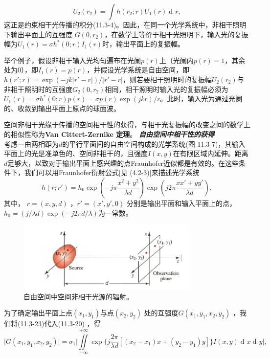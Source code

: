 \documentclass[UTF8]{ctexart}
\numberwithin{figure}{subsection}
\numberwithin{table}{subsection}
\DeclareMathOperator\dif{d\!}
\begin{document}
\begin{equation}
U_2(r_2) = \int h(r_2; r) U_1 (r) \dif r ,
\end{equation}
这正是约束相干光传播的积分(11.3-4)。因此，在同一个光学系统中，非相干照明下输出平面上的互强度 $G(0, r_2)$，在数学上等价于相干光照明下，输入光的复振幅为$U_1 (r) = \sigma h^\ast (0; r) I_1 (r)$时，输出平面上的复振幅。 
\par 举个例子，假设非相干输入光均匀遍布在光阑$p(r)$上（光阑内$p(r) = 1$，其余处为0），即$I_1 (r) = p(r)$，并假设光学系统是自由空间，即$h(r'; r) = \exp (-jk\lvert r' - r \rvert) / \lvert r' - r \rvert$，则若要相干照明时的复振幅$U_2 (r_2)$与非相干照明时的互强度$G_2 (0, r_2)$相同，相干照明时输入光的复振幅必须为$U_1 (r) = \sigma h^\ast (0; r) p(r) = \sigma p(r) \exp (jkr) / r$。此时，输入光为通过光阑的、收敛到输出平面上原点的球面波。
\par 空间非相干光缘于传播的空间相干性的获得，与相干光复振幅的改变之间的数学上的相似性称为\textbf{Van Cittert-Zernike 定理}。
\bigbreak\noindent\textcolor{ksc}{\textbf{\textsl{自由空间中相干性的获得}}}\\
考虑一由两相距为$d$的平行平面间的自由空间构成的光学系统(图 11.3-7)，其输入平面上的光是准单色的、空间非相干的，且强度$I(x,y)$在有限区域内延伸。距离 $d$足够大，以致对于输出平面上感兴趣的点Fraunhofer近似都是有效的。在这些条件下，我们可以用Fraunhofer衍射公式[见 (4.2-3)]来描述光学系统
\begin{equation}
h(r; r') = h_0 \exp (-j\pi \frac{x^2 + y^2}{\lambda d}) \exp (j2\pi \frac{xx' + yy'}{\lambda d}),
\end{equation}
其中， $r = (x,y,d)$ ，$r' = (x', y', 0)$ 分别是输出平面和输入平面上的点，$h_0 = (j / \lambda d) \exp(-j2\pi d / \lambda)$为一常数。
\begin{figure}[H]
\centering
\includegraphics[width=0.8\textwidth]{11_3_7.PNG}
\caption{自由空间中空间非相干光源的辐射。}
\label{fig: 11_3_7}
\end{figure}
\par 为了确定输出平面上点$(x_1, y_1)$与点$(x_2, y_2)$ 处的互强度$G(x_1, y_1, x_2, y_2)$ ，我们将(11.3-23)代入(11.3-20) ，得 
\begin{equation}
\lvert G(x_1, y_1, x_2, y_2) \rvert = \sigma_1 \bigg\lvert \iint\limits_{-\infty}^{+\infty} \exp \{j\frac{2\pi}{\lambda d} [(x_2 - x_1)x + (y_2 - y_1)y]\}I(x,y) \dif x \dif y \bigg\rvert ,
\end{equation}
\end{document}
